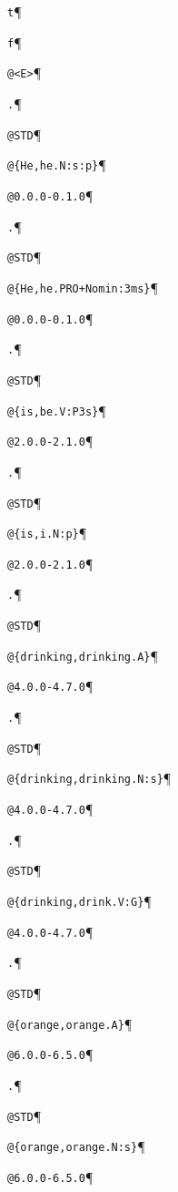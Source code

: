 \noindent\verb$t$\P

\noindent\verb$f$\P

\noindent\verb$@<E>$\P

\noindent\verb$.$\P

\noindent\verb$@STD$\P

\noindent\verb$@{He,he.N:s:p}$\P

\noindent\verb$@0.0.0-0.1.0$\P

\noindent\verb$.$\P

\noindent\verb$@STD$\P

\noindent\verb$@{He,he.PRO+Nomin:3ms}$\P

\noindent\verb$@0.0.0-0.1.0$\P

\noindent\verb$.$\P

\noindent\verb$@STD$\P

\noindent\verb$@{is,be.V:P3s}$\P

\noindent\verb$@2.0.0-2.1.0$\P

\noindent\verb$.$\P

\noindent\verb$@STD$\P

\noindent\verb$@{is,i.N:p}$\P

\noindent\verb$@2.0.0-2.1.0$\P

\noindent\verb$.$\P

\noindent\verb$@STD$\P

\noindent\verb$@{drinking,drinking.A}$\P

\noindent\verb$@4.0.0-4.7.0$\P

\noindent\verb$.$\P

\noindent\verb$@STD$\P

\noindent\verb$@{drinking,drinking.N:s}$\P

\noindent\verb$@4.0.0-4.7.0$\P

\noindent\verb$.$\P

\noindent\verb$@STD$\P

\noindent\verb$@{drinking,drink.V:G}$\P

\noindent\verb$@4.0.0-4.7.0$\P

\noindent\verb$.$\P

\noindent\verb$@STD$\P

\noindent\verb$@{orange,orange.A}$\P

\noindent\verb$@6.0.0-6.5.0$\P

\noindent\verb$.$\P

\noindent\verb$@STD$\P

\noindent\verb$@{orange,orange.N:s}$\P

\noindent\verb$@6.0.0-6.5.0$\P

